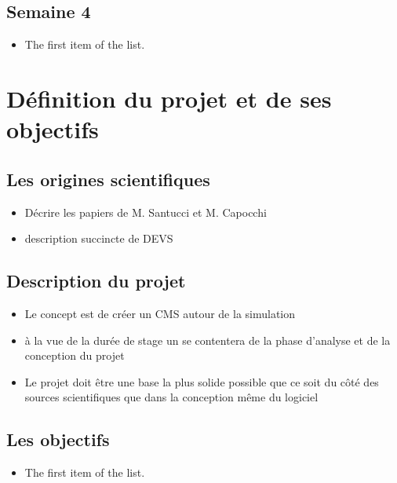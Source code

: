 \documentclass{rapport_stage}
\begin{document}
\section*{Semaine 4}

\begin{itemize}[label=$\bullet$]
  \item The first item of the list.
\end{itemize}

\chapter{Définition du projet et de ses objectifs}

\section{Les origines scientifiques}

\begin{itemize}[label=$\bullet$]
  \item Décrire les papiers de M. Santucci et M. Capocchi \cite{capocchi_devs_2022} \cite{capocchi_towards_2023}
  \item description succincte de DEVS
\end{itemize}

\section{Description du projet}

\begin{itemize}[label=$\bullet$]
  \item Le concept est de créer un CMS autour de la simulation
  \item à la vue de la durée de stage un se contentera de la phase d'analyse et de la conception du projet
  \item Le projet doit être une base la plus solide possible que ce soit du côté des sources scientifiques que dans la conception même du logiciel
\end{itemize}

\section{Les objectifs}

\begin{itemize}[label=$\bullet$]
  \item The first item of the list.
\end{itemize}
\end{document}
